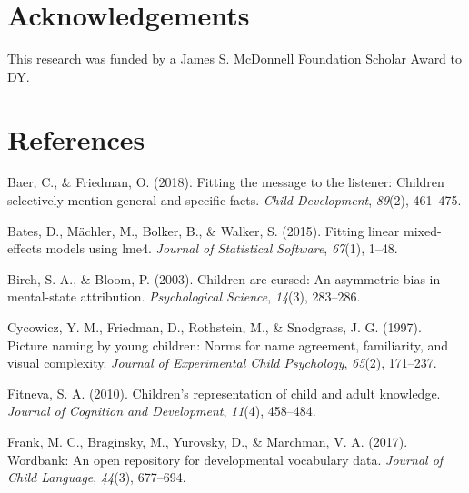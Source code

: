 \documentclass[10pt, letterpaper]{article}
\begin{document}
\vspace{1em} 

\hypertarget{acknowledgements}{%
\section{Acknowledgements}\label{acknowledgements}}

This research was funded by a James S. McDonnell Foundation Scholar
Award to DY.

\hypertarget{references}{%
\section{References}\label{references}}

\setlength{\parindent}{-0.1in} 
\setlength{\leftskip}{0.125in}

\noindent

\hypertarget{refs}{}
\leavevmode\hypertarget{ref-baer2018}{}%
Baer, C., \& Friedman, O. (2018). Fitting the message to the listener:
Children selectively mention general and specific facts. \emph{Child
Development}, \emph{89}(2), 461--475.

\leavevmode\hypertarget{ref-bates2015}{}%
Bates, D., Mächler, M., Bolker, B., \& Walker, S. (2015). Fitting linear
mixed-effects models using lme4. \emph{Journal of Statistical Software},
\emph{67}(1), 1--48.

\leavevmode\hypertarget{ref-birch2003}{}%
Birch, S. A., \& Bloom, P. (2003). Children are cursed: An asymmetric
bias in mental-state attribution. \emph{Psychological Science},
\emph{14}(3), 283--286.

\leavevmode\hypertarget{ref-cycowicz1997}{}%
Cycowicz, Y. M., Friedman, D., Rothstein, M., \& Snodgrass, J. G.
(1997). Picture naming by young children: Norms for name agreement,
familiarity, and visual complexity. \emph{Journal of Experimental Child
Psychology}, \emph{65}(2), 171--237.

\leavevmode\hypertarget{ref-fitneva2010}{}%
Fitneva, S. A. (2010). Children's representation of child and adult
knowledge. \emph{Journal of Cognition and Development}, \emph{11}(4),
458--484.

\leavevmode\hypertarget{ref-frank2017}{}%
Frank, M. C., Braginsky, M., Yurovsky, D., \& Marchman, V. A. (2017).
Wordbank: An open repository for developmental vocabulary data.
\emph{Journal of Child Language}, \emph{44}(3), 677--694.
\end{document}
